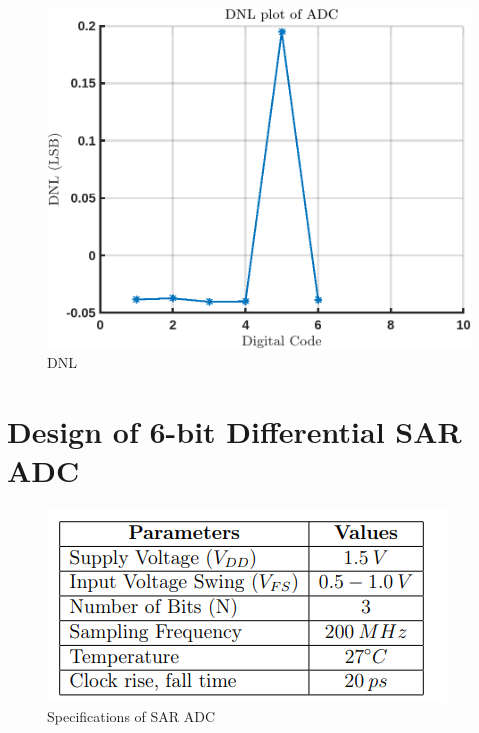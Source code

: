 \documentclass[a4paper,12pt]{article}
\begin{document}
\begin{figure}[H]
    \centering
    \includegraphics[max width = \textwidth]{Flash_ADC_images/DNL.png}
    \caption{DNL}
    \label{fig:enter-label}
\end{figure}

\section{Design of 6-bit Differential SAR ADC}
\begin{figure}
    \centering
    \includegraphics[width=1\linewidth]{spec.png}
    \caption{Specifications of SAR ADC}
    \label{fig:enter-label}
\end{figure}
\end{document}
